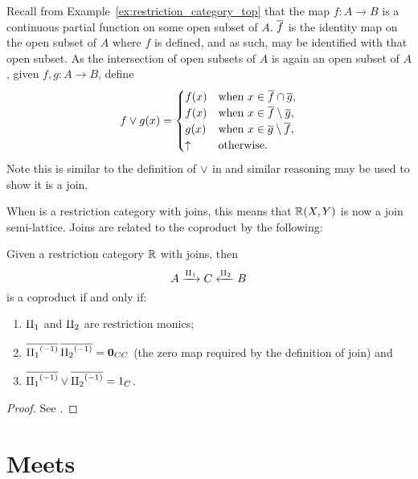 \begin{example}\label{ex:joins_in_top}
   Recall from Example~\ref{ex:restriction_category_top} that the map $f:A\to B$ is a continuous
   partial function on some open subset of $A$. $\overline{f}$ is the identity map on the open subset of
   $A$ where $f$ is defined, and as such, may be identified with that open subset.
   As the intersection of open subsets of $A$ is again
   an open subset of $A$, given $f,g:A\to B$, define
   \[
      f\vee g(x) = \begin{cases}
        f(x) &\text{when }x\in  \overline{f}\cap\overline{g},\\
        f(x) &\text{when }x\in  \overline{f}\setminus\overline{g},\\
        g(x) &\text{when }x\in  \overline{g}\setminus\overline{f},\\
        \uparrow &\text{otherwise.}
      \end{cases}
   \]
   Note this is similar to the definition of $\vee$ in \Par and similar reasoning may be used to
   show it is a join.
\end{example}

When \R is a restriction category with joins, this means that $\mathbb{R}(X,Y)$ is now a join
semi-lattice. Joins are related to the coproduct by the following:

\begin{theorem}\label{lem:join_determines_coproduct}
  Given a restriction category $\mathbb{R}$ with joins, then
  \[
    A \xrightarrow{\amalg_{1}} C \xleftarrow{\amalg_{2}} B
  \]
  is a coproduct if and only if:
  \begin{enumerate}[{(}i{)}]
    \item $\amalg_{1}$ and $\amalg_{2}$ are restriction monics;
    \item $\overline{{\amalg_{1}}^{(-1)}}\,\overline{{\amalg_{2}}^{(-1)}} = \mathbf{0}_{CC}$ (the zero map required by the definition of
      join) and
    \item $\overline{{\amalg_{1}}^{(-1)}} \vee \overline{{\amalg_{2}}^{(-1)}} = 1_C$.
  \end{enumerate}
\end{theorem}
\begin{proof}
  See \cite{cockett-guo2007:joinrestrictioncats}.
\end{proof}



\section{Meets} %
\label{sub:meets_in_restriction_categories}

